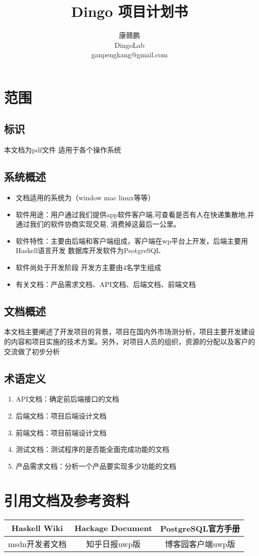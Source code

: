 \documentclass[UTF8]{dingo}
\author{康赣鹏 \\ DingoLab \\ganpengkang@gmail.com}
\title{Dingo 项目计划书}
\begin{document}
  \makecover
  \makecontent
  \section{范围}
	  \subsection{标识}
		  本文档为pdf文件 适用于各个操作系统
	  \subsection{系统概述}
		  \begin{itemize}
		  	\item 文档适用的系统为（window mac linux等等）
		  	\item 软件用途：用户通过我们提供app软件客户端,可查看是否有人在快递集散地,并通过我们的软件协商实现交易, 消费掉这最后一公里。
		  	\item 软件特性：主要由后端和客户端组成，客户端在wp平台上开发，后端主要用Haskell语言开发 数据库开发软件为PsotgreSQL
		  	\item 软件尚处于开发阶段 开发方主要由4名学生组成
		  	\item 有关文档：产品需求文档、API文档、后端文档、前端文档
		  \end{itemize}
		\subsection{文档概述}
			本文档主要阐述了开发项目的背景，项目在国内外市场测分析，项目主要开发建设的内容和项目实施的技术方案。另外，对项目人员的组织，资源的分配以及客户的交流做了初步分析
		\subsection{术语定义}
		\begin{enumerate}
			\item API文档：确定前后端接口的文档
			\item 后端文档：项目后端设计文档
			\item 前端文档：项目前端设计文档
			\item 测试文档：测试程序的是否能全面完成功能的文档
			\item 产品需求文档：分析一个产品要实现多少功能的文档
		\end{enumerate}
  \section{引用文档及参考资料}
	  \begin{tabular}{|c|c|c|}
	  	\hline
	  	Haskell Wiki & Hackage Document & PostgreSQL官方手册 \\ \hline
	  	msdn开发者文档 & 知乎日报uwp版 & 博客园客户端uwp版 \\ \hline
	  \end{tabular}
\end{document}

